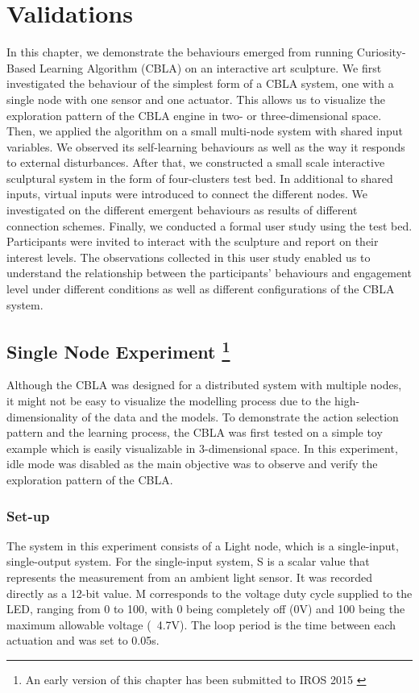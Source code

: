 \chapter{Validations} \label{chap:validations}

In this chapter, we demonstrate the behaviours emerged from running Curiosity-Based Learning Algorithm (CBLA) on an interactive art sculpture. We first investigated the behaviour of the simplest form of a CBLA system, one with a single node with one sensor and one actuator. This allows us to visualize the exploration pattern of the CBLA engine in two- or three-dimensional space. Then, we applied the algorithm on a small multi-node system with shared input variables. We observed its self-learning behaviours as well as the way it responds to external disturbances. After that, we constructed a small scale interactive sculptural system in the form of four-clusters test bed. In additional to shared inputs, virtual inputs were introduced to connect the different nodes. We investigated on the different emergent behaviours as results of different connection schemes. Finally, we conducted a formal user study using the test bed. Participants were invited to interact with the sculpture and report on their interest levels. The observations collected in this user study enabled us to understand the relationship between the participants' behaviours and engagement level under different conditions as well as different configurations of the CBLA system.


\section[Single Node Experiment]
{Single Node Experiment
	\footnote{An early version of this chapter has been submitted to IROS 2015 \cite{Chan2015} }}\label{sec:single-node}

Although the CBLA was designed for a distributed system with multiple nodes, it might not be easy to visualize the modelling process due to the high-dimensionality of the data and the models. To demonstrate the action selection pattern and the learning process, the CBLA was first tested on a simple toy example which is easily visualizable in 3-dimensional space. In this experiment, idle mode was disabled as the main objective was to observe and verify the exploration pattern of the CBLA. 

\subsection{Set-up}
The system in this experiment consists of a Light node, which is a single-input, single-output system. For the single-input system, S is a scalar value that represents the measurement from an ambient light sensor. It was recorded directly as a 12-bit value. M corresponds to the voltage duty cycle supplied to the LED, ranging from 0 to 100, with 0 being completely off (0V) and 100 being the maximum allowable voltage (~4.7V). The loop period is the time between each actuation and was set to 0.05s.

